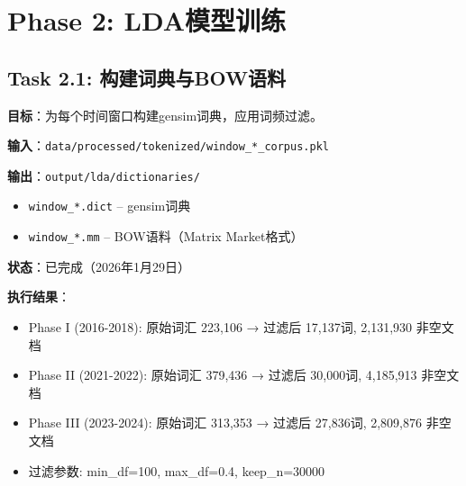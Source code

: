 \documentclass[12pt, a4paper]{ctexart}
\begin{document}
\section{Phase 2: LDA模型训练}

\subsection{Task 2.1: 构建词典与BOW语料}

\textbf{目标}：为每个时间窗口构建gensim词典，应用词频过滤。

\textbf{输入}：\texttt{data/processed/tokenized/window\_*\_corpus.pkl}

\textbf{输出}：\texttt{output/lda/dictionaries/}
\begin{itemize}
    \item \texttt{window\_*.dict} -- gensim词典
    \item \texttt{window\_*.mm} -- BOW语料（Matrix Market格式）
\end{itemize}

\textbf{状态}：已完成（2026年1月29日）

\textbf{执行结果}：
\begin{itemize}
    \item Phase I (2016-2018): 原始词汇 223,106 → 过滤后 17,137词, 2,131,930 非空文档
    \item Phase II (2021-2022): 原始词汇 379,436 → 过滤后 30,000词, 4,185,913 非空文档
    \item Phase III (2023-2024): 原始词汇 313,353 → 过滤后 27,836词, 2,809,876 非空文档
    \item 过滤参数: min\_df=100, max\_df=0.4, keep\_n=30000
\end{itemize}
\end{document}
